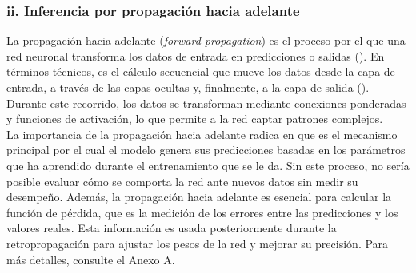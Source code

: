 \documentclass[11pt]{article} %
\begin{document}
\subsubsection{ii. Inferencia por propagación hacia adelante}
La propagación hacia adelante (\textit{forward propagation}) es el proceso por el que una red neuronal transforma los datos de entrada en predicciones o salidas (\cite{datacamp_redes}). En términos técnicos, es el cálculo secuencial que mueve los datos desde la capa de entrada, a través de las capas ocultas y, finalmente, a la capa de salida (\cite{nvidia}). Durante este recorrido, los datos se transforman mediante conexiones ponderadas y funciones de activación, lo que permite a la red captar patrones complejos. \\
La importancia de la propagación hacia adelante radica en que es el mecanismo principal por el cual el modelo genera sus predicciones basadas en los parámetros que ha aprendido durante el entrenamiento que se le da. Sin este proceso, no sería posible evaluar cómo se comporta la red ante nuevos datos sin medir su desempeño. Además, la propagación hacia adelante es esencial para calcular la función de pérdida, que es la medición de los errores entre las predicciones y los valores reales. Esta información es usada posteriormente durante la retropropagación  para ajustar los pesos de la red y mejorar su precisión. Para más detalles, consulte el Anexo A.
\end{document}
